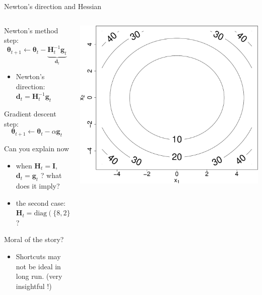 \documentclass[ignorenonframetext,aspectratio=169]{beamer}
\newcommand{\vv}[1]{\boldsymbol{#1}}
\begin{document}
\begin{frame}{Newton's direction and Hessian}
\protect\hypertarget{newtons-direction-and-hessian}{}

\begin{columns}

\begin{column}{0.75\textwidth}
Newton's method step: $$ \vv{\theta}_{t+1} \leftarrow \vv{\theta}_t -\underbrace{\vv{H}_t^{-1}\vv{g}_t}_{\vv{d}_t}$$

\begin{itemize}
\item Newton's direction: $\vv{d}_t = \vv{H}_t^{-1}\vv{g}_t$
\end{itemize}
 
  
Gradient descent step:  
  $$ \vv{\theta}_{t+1} \leftarrow \vv{\theta}_t -\alpha\vv{g}_t$$
  
Can you explain now
\begin{itemize}
 \item when $\vv{H}_t= \vv{I}$, $\vv{d}_t= \vv{g}_t$ ? what does it imply?
 \item the second case: $\vv{H}_t= \text{diag}(\{8,2\})$? 
\end{itemize}

Moral of the story? 
\begin{itemize}
 \item Shortcuts may not be ideal in long run. (very insightful !) 
\end{itemize}
\end{column}


\begin{column}{0.3\textwidth}

\begin{center}\includegraphics[height=0.35\textheight]{lecture9_files/figure-beamer/unnamed-chunk-8-1} \end{center}



\end{column}
\end{columns}
\end{frame}
\end{document}
